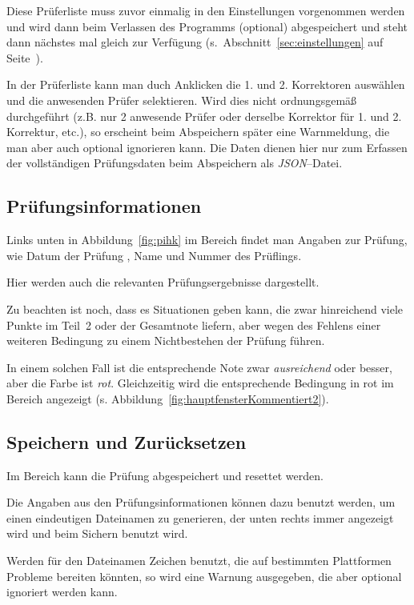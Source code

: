\documentclass[a4paper,notitlepage,parskip=half]{scrartcl}
\newcommand*\circled[1]{\tikz[baseline=(char.base)]{
            \node[shape=circle,draw,inner sep=2pt] (char) {#1};}}
\begin{document}
Diese Prüferliste muss zuvor einmalig in den Einstellungen vorgenommen werden und wird dann beim Verlassen des Programms (optional) abgespeichert und steht dann nächstes mal gleich zur Verfügung (s.~Abschnitt~\ref{sec:einstellungen} auf Seite~\pageref{sec:einstellungen}).

In der Prüferliste kann man duch Anklicken die 1. und 2. Korrektoren auswählen und die anwesenden Prüfer selektieren. Wird dies nicht ordnungsgemäß durchgeführt (z.B. nur 2 anwesende Prüfer oder derselbe Korrektor für 1. und 2. Korrektur, etc.), so erscheint beim Abspeichern später eine Warnmeldung, die man aber auch optional ignorieren kann. Die Daten dienen hier nur zum Erfassen der vollständigen Prüfungsdaten beim Abspeichern als \emph{JSON}--Datei. 

\subsection{Prüfungsinformationen}
Links unten in Abbildung~\ref{fig:pihk} im Bereich \circled{D} findet man Angaben zur Prüfung, wie Datum der Prüfung , Name und Nummer des Prüflings.

Hier werden auch die relevanten Prüfungsergebnisse dargestellt.

Zu beachten ist noch, dass es Situationen geben kann, die zwar hinreichend viele Punkte im Teil~2 oder der Gesamtnote liefern, aber wegen des Fehlens einer weiteren Bedingung zu einem Nichtbestehen der Prüfung führen.

In einem solchen Fall ist die entsprechende Note zwar \emph{ausreichend} oder besser, aber die Farbe ist \emph{rot}. Gleichzeitig wird die entsprechende Bedingung in rot im Bereich \circled{E} angezeigt (s. Abbildung~\ref{fig:hauptfensterKommentiert2}).

\subsection{Speichern und Zurücksetzen}
Im Bereich \circled{E} kann die Prüfung abgespeichert und resettet werden.

Die Angaben aus den Prüfungsinformationen können dazu benutzt werden, um einen eindeutigen Dateinamen zu generieren, der unten rechts immer angezeigt wird und beim Sichern benutzt wird. 

Werden für den Dateinamen Zeichen benutzt, die auf bestimmten Plattformen Probleme bereiten könnten, so wird eine Warnung ausgegeben, die aber optional ignoriert werden kann. 
\end{document}

